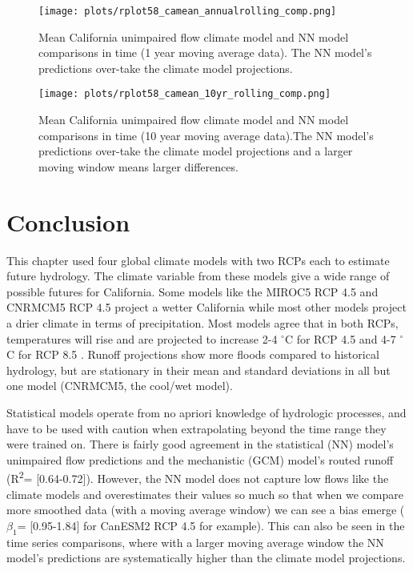 \begin{figure}
	\centering
	\texttt{[image: plots/rplot58\_camean\_annualrolling\_comp.png]}
	\caption[Mean California unimpaired flow climate model and NN model comparisons in time (annual moving average data).]{Mean California unimpaired flow climate model and NN model comparisons in time (1 year moving average data). The NN model's predictions over-take the climate model projections.} 
	\label{fig:camean_annual_comp_ts}
\end{figure}

\begin{figure}
	\centering
	\texttt{[image: plots/rplot58\_camean\_10yr\_rolling\_comp.png]}
	\caption[Mean California unimpaired flow climate model and NN model comparisons in time (10 year moving average data).]{Mean California unimpaired flow climate model and NN model comparisons in time (10 year moving average data).The NN model's predictions over-take the climate model projections and a larger moving window means larger differences.} 
	\label{fig:camean_10yr_comp_ts}
\end{figure}

\section{Conclusion}
This chapter used four global climate models with two RCPs each to estimate future hydrology. The climate variable from these models give a wide range of possible futures for California. Some models like the MIROC5 RCP 4.5 and CNRMCM5 RCP 4.5 project a wetter California while most other models project a drier climate in terms of precipitation. Most models agree that in both RCPs, temperatures will rise and are projected to increase 2-4 $^{\circ}$C for RCP 4.5 and 4-7 $^{\circ}$C for RCP 8.5 \cite{pierce2018climate}. Runoff projections show more floods compared to historical hydrology, but are stationary in their mean and standard deviations in all but one model (CNRMCM5, the cool/wet model). 

Statistical models operate from no apriori knowledge of hydrologic processes, and have to be used with caution when extrapolating beyond the time range they were trained on. There is fairly good agreement in the statistical (NN) model's unimpaired flow predictions and the mechanistic (GCM) model's routed runoff (R\textsuperscript{2}= [0.64-0.72]). However, the NN model does not capture low flows like the climate models and overestimates their values so much so that when we compare more smoothed data (with a moving average window) we can see a bias emerge ($\beta_1$= [0.95-1.84] for CanESM2 RCP 4.5 for example). This can also be seen in the time series comparisons, where with a larger moving average window the NN model's predictions are systematically higher than the climate model projections. 

